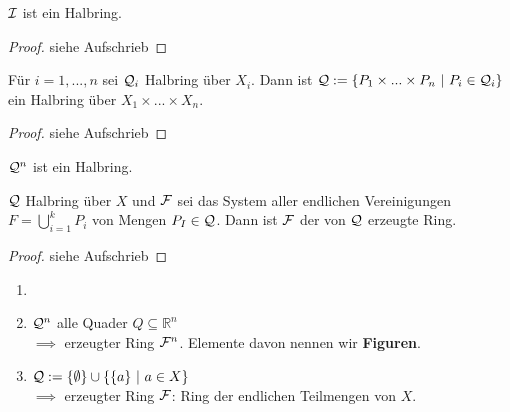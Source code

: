 \documentclass[11pt,a4paper,fleqn,openany]{report}
\begin{document}
    \begin{theorem}[i.A. II.19]
      $\mathcal{I}$ ist ein Halbring.
    \end{theorem}

    \begin{proof}
      siehe Aufschrieb
    \end{proof}

    \begin{theorem}[i.A. II.20]
      Für $i = 1, ..., n$ sei $\mathcal{Q}_i$ Halbring über $X_i$. Dann ist $\mathcal{Q}:=\{P_1 \times ... \times P_n \ | \ P_i \in \mathcal{Q}_i\}$ ein Halbring über $X_1 \times ... \times X_n$.
    \end{theorem}

    \begin{proof}
      siehe Aufschrieb
    \end{proof}

    \begin{theorem}[i.A. II.21]
      $\mathcal{Q}^n$ ist ein Halbring.
    \end{theorem}


    \begin{theorem}[i.A. II.22]
      $\mathcal{Q}$ Halbring über $X$ und $\mathcal{F}$ sei das System aller endlichen Vereinigungen $F=\bigcup\limits_{i=1}^k P_i$ von Mengen $P_I \in \mathcal{Q}$. Dann ist $\mathcal{F}$ der von $\mathcal{Q}$ erzeugte Ring.
    \end{theorem}

    \begin{proof}
      siehe Aufschrieb
    \end{proof}

    \begin{example}
      \begin{enumerate}
        \item[]
        \item $\mathcal{Q}^n$ alle Quader $Q \subseteq \mathbb{R}^n$\\
              $\implies$ erzeugter Ring $\mathcal{F}^n$. Elemente davon nennen wir \textbf{Figuren}. 
        \item $\mathcal{Q} := \{\emptyset\} \cup \{\{a\} \ | \ a \in X\}$\\
              $\implies$ erzeugter Ring $\mathcal{F}$: Ring der endlichen Teilmengen von $X$.
      \end{enumerate}
    \end{example}
\end{document}
